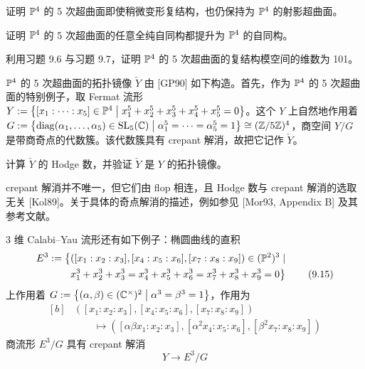 \begin{exercise}
证明 $\mathbb{P}^4$ 的 5 次超曲面即使稍微变形复结构，也仍保持为 $\mathbb{P}^4$ 的射影超曲面。
\end{exercise}

\begin{exercise}
证明 $\mathbb{P}^4$ 的 5 次超曲面的任意全纯自同构都提升为 $\mathbb{P}^4$ 的自同构。
\end{exercise}

\begin{exercise}
利用习题 9.6 与习题 9.7，证明 $\mathbb{P}^4$ 的 5 次超曲面的复结构模空间的维数为 101。
\end{exercise}

$\mathbb{P}^4$ 的 5 次超曲面的拓扑镜像 $\check Y$ 由 [GP90] 如下构造。首先，作为 $\mathbb{P}^4$ 的 5 次超曲面的特别例子，取 Fermat 流形 $Y:=\left\{[x_1:\cdots:x_5]\in\mathbb{P}^4\;\middle|\;x_1^5+x_2^5+x_3^5+x_4^5+x_5^5=0\right\}$。这个 $Y$ 上自然地作用着 $G:=\left\{\operatorname{diag}(\alpha_1,\ldots,\alpha_5)\in \mathrm{SL}_5(\mathbb{C})\;\middle|\;\alpha_1^5=\cdots=\alpha_5^5=1\right\}\cong(\mathbb{Z}/5\mathbb{Z})^4$，商空间 $Y/G$ 是带商奇点的代数簇。该代数簇具有 crepant 解消，故把它记作 $\check Y$。

\begin{exercise}
计算 $\check Y$ 的 Hodge 数，并验证 $\check Y$ 是 $Y$ 的拓扑镜像。
\end{exercise}

crepant 解消并不唯一，但它们由 flop 相连，且 Hodge 数与 crepant 解消的选取无关 [Kol89]。关于具体的奇点解消的描述，例如参见 [Mor93, Appendix B] 及其参考文献。

3 维 Calabi--Yau 流形还有如下例子：椭圆曲线的直积
\begin{equation}
  \begin{aligned}[b]
    E^3:=\big\{&([x_1:x_2:x_3],[x_4:x_5:x_6],[x_7:x_8:x_9])\in(\mathbb{P}^2)^3\mid{}\\
    &x_1^3+x_2^3+x_3^3=x_4^3+x_5^3+x_6^3=x_7^3+x_8^3+x_9^3=0\big\}
  \end{aligned}
  \tag{9.15}
\end{equation}
上作用着 $G:=\left\{(\alpha,\beta)\in(\mathbb{C}^\times)^2\;\middle|\;\alpha^3=\beta^3=1\right\}$，作用为
\begin{equation}
  \begin{aligned}[b]
    &([x_1:x_2:x_3],[x_4:x_5:x_6],[x_7:x_8:x_9])\\
    &\qquad\mapsto([\alpha\beta x_1:x_2:x_3],[\alpha^2x_4:x_5:x_6],[\beta^2x_7:x_8:x_9])
  \end{aligned}
  \tag{9.16}
\end{equation}
商流形 $E^3/G$ 具有 crepant 解消
\begin{equation}
  Y\to E^3/G
  \tag{9.17}
\end{equation}

